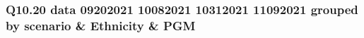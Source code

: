 \subsubsection{Q10.20 data 09202021 10082021 10312021 11092021 grouped by scenario \& Ethnicity \& PGM}

\begin{comment}
                                  EFPR        EO      EFNR     n    pvalue
(frauth, Maj, Advantaged)     0.530303  0.469697  0.515152  33.0  0.620400
(frauth, Min, Advantaged)     0.521739  0.478261  0.369565  23.0  0.740717
(frauth, Min, Disadvantaged)  0.404762  0.595238  0.523810  21.0  0.287938
(icu, Maj, Advantaged)        0.685185  0.314815  0.666667  27.0  0.030762
(icu, Maj, Disadvantaged)     0.571429  0.428571  0.571429   7.0  0.444564
(icu, Min, Advantaged)        0.450000  0.550000  0.300000  10.0  0.873227
(icu, Min, Disadvantaged)     0.450000  0.550000  0.725000  20.0  0.716623
(rent, Maj, Advantaged)       0.423077  0.576923  0.461538  26.0  0.704787
(rent, Maj, Disadvantaged)    0.333333  0.666667  0.541667  12.0  0.125971
(rent, Min, Advantaged)       0.312500  0.687500  0.312500   8.0  0.133614
(rent, Min, Disadvantaged)    0.557692  0.442308  0.403846  26.0  0.345427
\end{comment}

